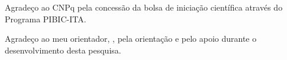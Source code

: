 \label{sec:agradecimentos}

Agradeço ao CNPq pela concessão da bolsa de iniciação científica através do Programa PIBIC-ITA.

Agradeço ao meu orientador, \nomeorientador, pela orientação e pelo apoio durante o desenvolvimento desta pesquisa.
